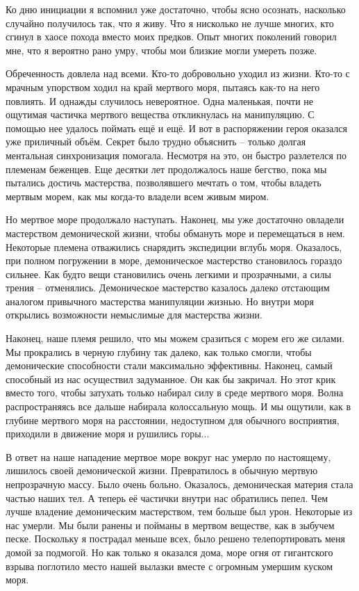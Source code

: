 \documentclass[12pt,a4paper]{article}
\begin{document}
Ко дню инициации я вспомнил уже достаточно, чтобы ясно осознать, насколько случайно получилось так, что я живу. Что я нисколько не лучше многих, кто сгинул в хаосе похода вместо моих предков. Опыт многих поколений говорил мне, что я вероятно рано умру, чтобы мои близкие могли умереть позже.

Обреченность довлела над всеми. Кто-то добровольно уходил из жизни. Кто-то с мрачным упорством ходил на край мертвого моря, пытаясь как-то на него повлиять. И однажды случилось невероятное. Одна маленькая, почти не ощутимая частичка мертвого вещества откликнулась на манипуляцию. С помощью нее удалось поймать ещё и ещё. И вот в распоряжении героя оказался уже приличный объём. Секрет было трудно объяснить -- только долгая ментальная синхронизация помогала. Несмотря на это, он быстро разлетелся по племенам беженцев. Еще десятки лет продолжалось наше бегство, пока мы пытались достичь мастерства, позволявшего мечтать о том, чтобы владеть мертвым морем, как мы когда-то владели всем живым миром.

Но мертвое море продолжало наступать. Наконец, мы уже достаточно овладели мастерством демонической жизни, чтобы обмануть море и перемещаться в нем. Некоторые племена отважились снарядить экспедиции вглубь моря. Оказалось, при полном погружении в море, демоническое мастерство становилось гораздо сильнее. Как будто вещи становились очень легкими и прозрачными, а силы трения -- отменялись. Демоническое мастерство казалось далеко отстающим аналогом привычного мастерства манипуляции жизнью. Но внутри моря открылись возможности немыслимые для мастерства жизни.

Наконец, наше племя решило, что мы можем сразиться с морем его же силами. Мы прокрались в черную глубину так далеко, как только смогли, чтобы демонические способности стали максимально эффективны. Наконец, самый способный из нас осуществил задуманное. Он как бы закричал. 
Но этот крик вместо того, чтобы затухать только набирал силу в среде мертвого моря. Волна распространяясь все дальше набирала колоссальную мощь. И мы ощутили, как в глубине мертвого моря на расстоянии, недоступном для обычного восприятия, приходили в движение моря и рушились горы...

В ответ на наше нападение мертвое море вокруг нас умерло по настоящему, лишилось своей демонической жизни. Превратилось в обычную мертвую непрозрачную массу. Было очень больно. Оказалось, демоническая материя стала частью наших тел. А теперь её частички внутри нас обратились пепел. Чем лучше владение демоническим мастерством, тем больше был урон. Некоторые из нас умерли. Мы были ранены и пойманы в мертвом веществе, как в зыбучем песке. Поскольку я пострадал меньше всех, было решено телепортировать меня домой за подмогой. Но как только я оказался дома, море огня от гигантского взрыва поглотило место нашей вылазки вместе с огромным умершим куском моря.
\end{document}
